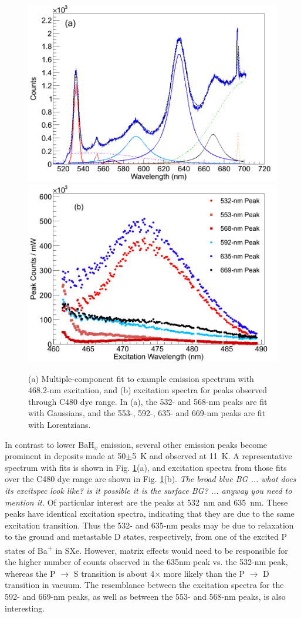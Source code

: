 \begin{figure} %
        \centering
                \includegraphics[width=.7\textwidth]{figures/excitspecBlue_a.png}
                \includegraphics[width=.7\textwidth]{figures/excitspecBlue_b.png}
                \caption{(a) Multiple-component fit to example emission spectrum with 468.2-nm excitation, and (b) excitation spectra for peaks observed through C480 dye range.  In (a), the 532- and 568-nm peaks are fit with Gaussians, and the 553-, 592-, 635- and 669-nm peaks are fit with Lorentzians.}
\label{fig:excitspecBlue}
\end{figure}

In contrast to lower BaH$_{x}$ emission, several other emission peaks become prominent in deposits made at 50$\pm$5~K and observed at 11~K.  A representative spectrum with fits is shown in Fig. \ref{fig:excitspecBlue}(a), and excitation spectra from those fits over the C480 dye range are shown in Fig. \ref{fig:excitspecBlue}(b).  \emph{\color{gray}The broad blue BG ... what does its excitspec look like? is it possible it is the surface BG? ... anyway you need to mention it.}  Of particular interest are the peaks at 532~nm and 635~nm.  These peaks have identical excitation spectra, indicating that they are due to the same excitation transition.  Thus the 532- and 635-nm peaks may be due to relaxation to the ground and metastable D states, respectively, from one of the excited P states of Ba\textsuperscript{+} in SXe.  However, matrix effects would need to be responsible for the higher number of counts observed in the 635nm peak vs. the 532-nm peak, whereas the P $\rightarrow$ S transition is about 4$\times$ more likely than the P $\rightarrow$ D transition in vacuum.  The resemblance between the excitation spectra for the 592- and 669-nm peaks, as well as between the 553- and 568-nm peaks, is also interesting.  


